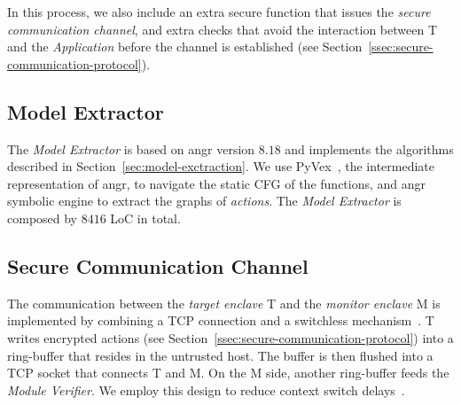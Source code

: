 In this process, we also include an extra secure function that issues the 
\emph{secure communication channel}, and extra checks that avoid the 
interaction between T and the \emph{Application} before the channel is 
established (see Section~\ref{ssec:secure-communication-protocol}).


\subsection{Model Extractor}
\label{ssec:model-generation}

The \emph{Model Extractor} is based on angr version $8.18$ and implements the 
algorithms described in Section~\ref{sec:model-exctraction}.
We use PyVex~\citep{shoshitaishvili2015firmalice}, the intermediate 
representation of angr, to navigate the static CFG of the 
functions, and angr symbolic engine to extract the graphs of \emph{actions}.
The \emph{Model Extractor} is composed by $8416$ LoC in total.




\subsection{Secure Communication Channel}
\label{ssec:monitor-target-channel}

The communication between the \emph{target enclave} T and the \emph{monitor 
	enclave} M is implemented by combining a TCP connection and a switchless 
mechanism~\citep{tian2018switchless}.
T writes encrypted actions (see 
Section~\ref{ssec:secure-communication-protocol}) into a ring-buffer that 
resides in the untrusted host.
The buffer is then flushed into a TCP socket that connects T and M.
On the M side, another ring-buffer feeds the \emph{Module Verifier}.
We employ this design to reduce context switch 
delays~\citep{tian2018switchless}.

